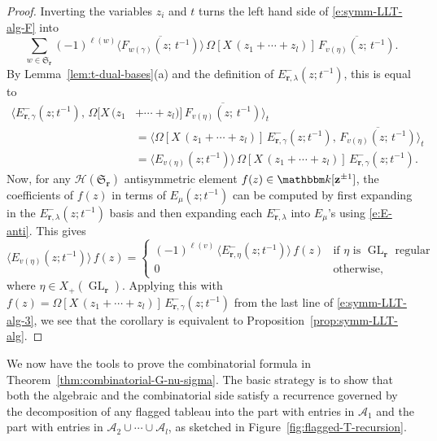 \documentclass[12pt]{amsart}
\theoremstyle{definition}
\theoremstyle{remark}
\newcommand{\kk}{{\mathbbm k}}
\newcommand{\rr}{{\mathbf r}}
\newcommand{\zz}{{\mathbf z}}
\newcommand{\Sfrak}{{\mathfrak S}}
\newcommand{\Acal}{{\mathcal A}}
\newcommand{\Hcal}{{\mathcal H}}
\DeclareMathOperator{\GL}{GL}
\begin{document}
\begin{proof}
Inverting the variables $z_{i}$ and $t$ turns the left hand side of
\eqref{e:symm-LLT-alg-F} into
\begin{equation}\label{e:symm-LLT-alg-2}
\sum _{w\in \Sfrak _{\rr }} (-1)^{\ell (w)} \langle
\overline{F_{w(\gamma )}(z;\, t^{-1})} \rangle\, \Omega [X\,
(z_{1}+\cdots +z_{l})]\, \overline{F_{v(\eta )}(z;\, t^{-1})}.
\end{equation}
By Lemma~\ref{lem:t-dual-bases}(a) and the definition of $E^{-}_{\rr
,\lambda }(z; t^{-1})$, this is equal to
\begin{equation}\label{e:symm-LLT-alg-3}
\begin{aligned}
\langle E^{-}_{\rr ,\gamma }(z;t^{-1}),\, \Omega [X\, (z_{1}& +\cdots
+z_{l})]\, \overline{F_{v(\eta )}(z;\, t^{-1})} \rangle _{t}\\
& = \langle \Omega [X\, (z_{1}+ \cdots +z_{l})]\, E^{-}_{\rr ,\gamma
}(z;t^{-1}),\,
\overline{F_{v(\eta )}(z;\, t^{-1})} \rangle _{t}\\
& = \langle E_{v(\eta )}(z;t^{-1}) \rangle \, \Omega [X\, (z_{1}+
\cdots +z_{l})]\, E^{-}_{\rr ,\gamma }(z;t^{-1}).
\end{aligned}
\end{equation}
Now, for any $\Hcal (\Sfrak _{\rr })$ antisymmetric element
$f(z)\in \kk [\zz ^{\pm 1}]$, the coefficients of $f(z)$ in terms of
$E_{\mu}(z;t^{-1}) $ can be computed by first expanding in the
$E^{-}_{\rr ,\lambda }(z; t^{-1})$ basis and then expanding each
$E^{-}_{\rr ,\lambda }$ into $E_\mu$'s using \eqref{e:E-anti}.  This
gives
\begin{equation}\label{e:anti-symm-expansion}
\langle E_{v(\eta )}(z;t^{-1}) \rangle \,f(z) =
\begin{cases}
(-1)^{\ell (v)}\, \langle E^{-}_{\rr ,\eta }(z;t^{-1}) \rangle\, f(z)
&	\text{if $\eta $ is $\GL _{\rr }$ regular}\\
0&	\text{otherwise},
\end{cases}
\end{equation}
where $\eta \in X_{+}(\GL _{\rr })$.  Applying this with $f(z) =
\Omega [X\, (z_{1}+ \cdots +z_{l})]\, E^{-}_{\rr ,\gamma }(z;t^{-1})$
from the last line of \eqref{e:symm-LLT-alg-3}, we see that the
corollary is equivalent to Proposition~\ref{prop:symm-LLT-alg}.
\end{proof}

We now have the tools to prove the combinatorial formula in
Theorem~\ref{thm:combinatorial-G-nu-sigma}.  The basic strategy is to
show that both the algebraic and the combinatorial side satisfy a
recurrence governed by the decomposition of any flagged tableau into
the part with entries in $\Acal _{1}$ and the part with entries in
$\Acal _{2}\cup \cdots \cup \Acal _{l}$, as sketched in
Figure~\ref{fig:flagged-T-recursion}.
\end{document}
